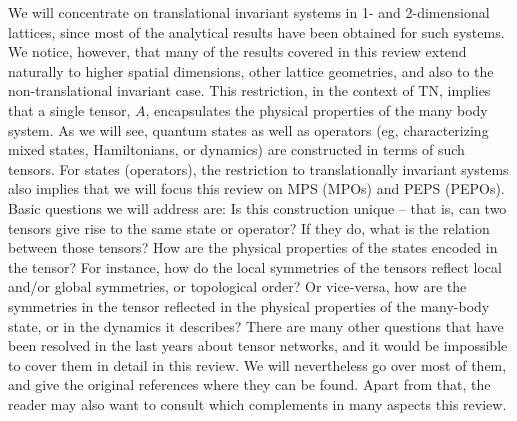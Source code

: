 \documentclass[rmp,aps,reprint,superscriptaddress,nobalancelastpage]{revtex4-1}
\begin{document}
We will concentrate on translational invariant systems in 1- and 2-dimensional lattices, since most of the analytical results have been obtained for such systems. We notice, however, that many of the results covered in this review extend naturally to higher spatial dimensions, other lattice geometries, and also to the non-translational invariant case. This restriction, in the context of TN, implies that a single tensor, $A$, encapsulates the physical properties of the many body system. As we will see, quantum states as well as operators (eg, characterizing mixed states, Hamiltonians, or dynamics) are constructed in terms of such tensors. For states (operators), the restriction to translationally invariant systems also implies that we will focus this review on MPS (MPOs) and PEPS (PEPOs).  Basic questions we will address are: Is this construction unique -- that is, can two tensors give rise to the same state or operator? If they do, what is the relation between those tensors? How are the physical properties of the states encoded in the tensor? For instance, how do the local symmetries of the tensors reflect local and/or global symmetries, or topological order? Or vice-versa, how are the symmetries in the tensor reflected in the physical properties of the many-body state, or in the dynamics it describes? There are many other questions that have been resolved in the last years about tensor networks, and it would be impossible to cover them in detail in this review. We will nevertheless go over most of them, and give the original references where they can be found. Apart from that, the reader may also want to consult \citet{zeng2019quantum} which complements in many aspects this review.
\end{document}
